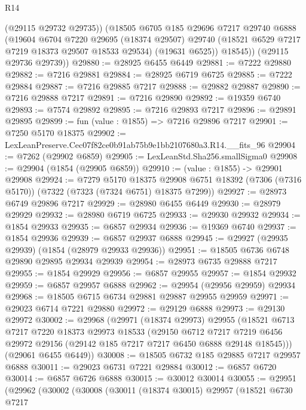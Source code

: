 \begin{lexlean}{R14}
\begin{coremodule}
          (@29115 @29732 @29735))
        (@18505
          @6705
          @185
          @29696
          @7217
          @29740
          @6888
          (@19604
            @6704
            @7220
            @29695
            (@18374 @29507)
            @29740
            (@18521 @6529 @7217 @7219 @18373 @29507 @18533 @29534)
            (@19631 @6525))
          @18545))
      (@29115 @29736 @29739))
@29880 := @28925 @6455 @6449
@29881 := @7222 @29880
@29882 := @7216 @29881
@29884 := @28925 @6719 @6725
@29885 := @7222 @29884
@29887 := @7216 @29885 @7217
@29888 := @29882 @29887
@29890 := @7216 @29888 @7217
@29891 := @7216 @29890
@29892 := @19359 @6740
@29893 := @7574 @29892
@29895 := @7216 @29893 @7217
@29896 := @29891 @29895
@29899 := fun (value : @1855) => @7216 @29896 @7217
@29901 := @7250 @5170 @18375
@29902 := LexLeanPreserve.Cec07f82ce0b91ab75b9e1bb2107680a3.R14.__fits_96
@29904 := @7262 (@29902 @6859)
@29905 := LexLeanStd.Sha256.smallSigma0
@29908 := @29904 (@1854 (@29905 @6859))
@29910 := (value : @1855) -> @29901 @29908
@29924 := @7279
    @5170
    @18375
    @29908
    @6751
    @18392
    (@7306 (@7316 @5170))
    (@7322 (@7323 (@7324 @6751) @18375 @7299))
@29927 := @28973 @6749 @29896 @7217
@29929 := @28980 @6455 @6449
@29930 := @28979 @29929
@29932 := @28980 @6719 @6725
@29933 := @29930 @29932
@29934 := @1854 @29933
@29935 := @6857 @29934
@29936 := @19369 @6740
@29937 := @1854 @29936
@29939 := @6857 @29937 @6888
@29945 := @29927 (@29935 @29939) (@1854 (@28979 @29933 @29936))
@29951 := @18505 @6736 @6748 @29890 @29895 @29934 @29939
@29954 := @28973 @6735 @29888 @7217
@29955 := @1854 @29929
@29956 := @6857 @29955
@29957 := @1854 @29932
@29959 := @6857 @29957 @6888
@29962 := @29954 (@29956 @29959) @29934
@29968 := @18505 @6715 @6734 @29881 @29887 @29955 @29959
@29971 := @29023 @6714 @7221 @29880
@29972 := @29129 @6888
@29973 := @29130 @29972
@30002 := @29968
    (@29971
      (@18374 @29973)
      @29955
      (@18521
        @6713
        @7217
        @7220
        @18373
        @29973
        @18533
        (@29150
          @6712
          @7217
          @7219
          @6456
          @29972
          @29156
          (@29142 @185 @7217 @7217 @6450 @6888 @29148 @18545)))
      (@29061 @6455 @6449))
@30008 := @18505 @6732 @185 @29885 @7217 @29957 @6888
@30011 := @29023 @6731 @7221 @29884
@30012 := @6857 @6720
@30014 := @6857 @6726 @6888
@30015 := @30012 @30014
@30055 := @29951
    (@29962
      (@30002
        (@30008
          (@30011
            (@18374 @30015)
            @29957
            (@18521
              @6730
              @7217

\end{coremodule}
\end{lexlean}
